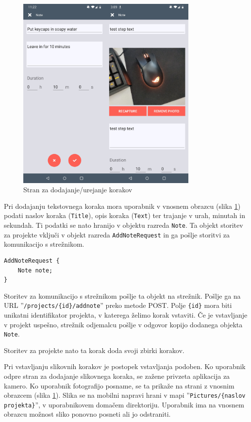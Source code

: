 \documentclass[a4paper, 12pt]{book}
\begin{document}
\begin{figure}[H]
\begin{center}
	\includegraphics[width=9cm]{app_note_image}
\end{center}
	\caption{Stran za dodajanje/urejanje korakov}
\label{app_note}
\end{figure}

Pri dodajanju tekstovnega koraka mora uporabnik v vnosnem obrazcu (slika \ref{app_note}) podati naslov koraka (\texttt{Title}), opis koraka (\texttt{Text}) ter trajanje v urah, minutah in sekundah.
Ti podatki se nato hranijo v objektu razreda \texttt{Note}.
Ta objekt storitev za projekte vključi v objekt razreda \texttt{AddNoteRequest} in ga pošlje storitvi za komunikacijo s strežnikom.

\begin{Verbatim}[commandchars=+\[\]]
AddNoteRequest { 
    Note note; 
}
\end{Verbatim}

Storitev za komunikacijo s strežnikom pošlje ta objekt na strežnik.
Pošlje ga na URL ''\texttt{/projects/\{id\}/addnote}'' preko metode POST.
Polje \texttt{\{id\}} mora biti unikatni identifikator projekta, v katerega želimo korak vstaviti.
Če je vstavljanje v projekt uspešno, strežnik odjemalcu pošlje v odgovor kopijo dodanega objekta \texttt{Note}.

Storitev za projekte nato ta korak doda svoji zbirki korakov.

Pri vstavljanju slikovnih korakov je postopek vstavljanja podoben.
Ko uporabnik odpre stran za dodajanje slikovnega koraka, se zažene privzeta aplikacija za kamero.
Ko uporabnik fotografijo posname, se ta prikaže na strani z vnosnim obrazcem (slika \ref{app_note}).
Slika se na mobilni napravi hrani v mapi ''\texttt{Pictures/\{naslov projekta\}}'', v uporabnikovem domačem direktoriju.
Uporabnik ima na vnosnem obrazcu možnost sliko ponovno posneti ali jo odstraniti.
\end{document}
